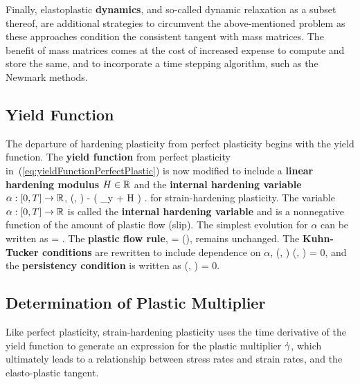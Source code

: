 Finally, elastoplastic {\bf dynamics}, and so-called dynamic 
relaxation as a subset thereof,
are additional strategies to circumvent the above-mentioned 
problem as these approaches condition the
consistent tangent with mass matrices.  The benefit of 
mass matrices comes at the cost of increased expense to compute 
and store the same, and to incorporate
a time stepping algorithm, such as the Newmark methods.

\subsection{Yield Function}
The departure of hardening plasticity from perfect plasticity 
begins with the yield function.
The {\bf yield function} from perfect 
plasticity in~(\ref{eq:yieldFunctionPerfectPlastic}) 
is now modified to include a {\bf linear hardening modulus} $H \in \mathbb{R}$ and
the {\bf internal hardening variable} $\alpha : [0, T] \rightarrow \mathbb{R}$,
\be
 \Phi(\sigma, \hstrainp)  \abs{\sigma} - \left( \sigma_y + H \alpha \right) .
 \label{eq:yieldFunctionHardening}
\ee
for strain-hardening plasticity.
The variable $\alpha : [0, T] \rightarrow \mathbb{R}$ is called the 
{\bf internal hardening variable} and is a nonnegative function of the amount of 
plastic flow (slip).  
The simplest evolution for $\alpha$ can be written as
\be
 \alphadot = \abs{\hstrainpdot}.
\ee
The {\bf plastic flow rule}, 
\be 
 \hstrainpdot = \gammadot \; \sign(\sigma),
 \label{eq:plasticFlowRuleHarding}
\ee
remains unchanged.  The {\bf Kuhn-Tucker conditions} are rewritten to include 
dependence on $\alpha$, 
\be
  \gammadot {} \;\;\;\;\; 
  \Phi(\sigma, \alpha)  \;\;\;\;\;
  \gammadot \; \Phi(\sigma, \alpha) = 0, 
\ee
and the {\bf persistency condition} is written as
\be
 \gammadot \; \Phidot(\sigma, \alpha) = 0.
\ee

\subsection{Determination of Plastic Multiplier}
Like perfect plasticity, strain-hardening plasticity uses the time derivative
of the yield function to generate an expression for the plastic multiplier
$\dot{\gamma}$, which ultimately leads to a relationship between stress rates and
strain rates, and the elasto-plastic tangent.

